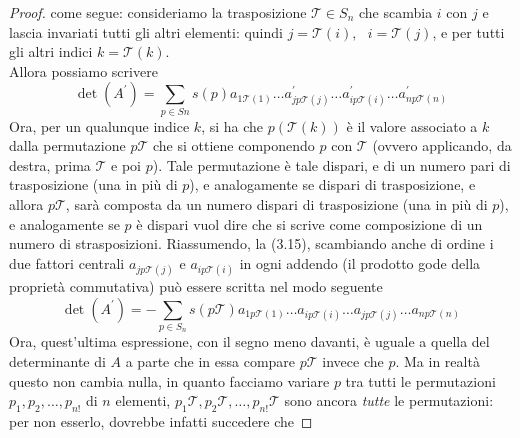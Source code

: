 \documentclass{book}
\begin{document}
\begin{enumerate}
\begin{proof}
			come segue: consideriamo la trasposizione $\mathcal{T}\in S_n$ che
			scambia $i$ con $j$ e lascia invariati tutti gli altri elementi:
			quindi $j=\mathcal{T}(i), \text{ } i=\mathcal{T}(j)$, e per tutti
			gli altri indici $k =\mathcal{T}(k)$.\\
			Allora possiamo scrivere
			\begin{equation}
				\det(A^\prime) = \sum_{p\in Sn} s(p) a_{1\mathcal{T}(1)}\dots
				a^\prime_{jp\mathcal{T}(j)}\dots a^\prime_{ip\mathcal{T}(i)}
				\dots a^\prime_{np\mathcal{T}(n)} 
			\end{equation}
			Ora, per un qualunque indice $k$, si ha che $p(\mathcal{T}(k))$ è
			il valore associato a $k$ dalla permutazione $p \mathcal{T}$ che si
			ottiene componendo $p$ con $\mathcal{T}$ (ovvero applicando, da
			destra, prima $\mathcal{T}$ e poi $p$). Tale permutazione è tale
			dispari, e di un numero pari di trasposizione (una in più di $p$),
			e analogamente se dispari di trasposizione, e allora
			$p\mathcal{T}$, sarà composta da un numero dispari di trasposizione
			(una in più di $p$), e analogamente se $p$ è dispari vuol dire che
			si scrive come composizione di un numero di strasposizioni.
			Riassumendo, la (3.15), scambiando anche di ordine i due fattori
			centrali $a_{j p\mathcal{T}(j)}$ e $a_{ip\mathcal{T}(i)}$ in ogni
			addendo (il prodotto gode della proprietà commutativa) può essere
			scritta nel modo seguente
			\begin{equation}
				\det(A^\prime) = -\sum_{p\in S_n} s(p\mathcal{T})
				a_{1p\mathcal{T}(1)} \dots a_{i p\mathcal{T}(i)} \dots a_{j
				p\mathcal{T}(j)} \dots a_{n p\mathcal{T}(n)}
			\end{equation}
			Ora, quest'ultima espressione, con il segno meno davanti, è uguale
			a quella del determinante di $A$ a parte che in essa compare
			$p\mathcal{T}$ invece che $p$. Ma in realtà questo non cambia
			nulla, in quanto facciamo variare $p$ tra tutti le permutazioni
			$p_1,p_2,\dots,p_{n!}$ di $n$ elementi, $p_1\mathcal{T},
			p_2\mathcal{T},\dots,p_{n!}\mathcal{T}$ sono ancora {\em tutte} le
			permutazioni: per non esserlo, dovrebbe infatti succedere che 
		\end{proof}
\end{enumerate}

\printindex
\end{document}
